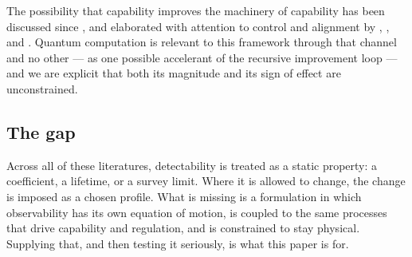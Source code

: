 The possibility that capability improves the machinery of capability has been
discussed since \citet{good1965}, and elaborated with attention to control and
alignment by \citet{bostrom2014}, \citet{russell2019}, \citet{omohundro2008} and
\citet{yudkowsky2008}. Quantum computation is relevant to this framework through
that channel and no other --- as one possible accelerant of the recursive
improvement loop \citep{shor1994,preskill2018,nielsen2010} --- and we are
explicit that both its magnitude and its sign of effect are unconstrained.
\Speculative

\subsection{The gap}

Across all of these literatures, detectability is treated as a static property:
a coefficient, a lifetime, or a survey limit. Where it is allowed to change, the
change is imposed as a chosen profile. What is missing is a formulation in which
observability has its own equation of motion, is coupled to the same processes
that drive capability and regulation, and is constrained to stay physical.
Supplying that, and then testing it seriously, is what this paper is for.

